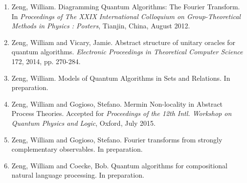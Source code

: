\begin{enumerate}
\item Zeng, William. Diagramming Quantum Algorithms: The Fourier Transform. In \emph{Proceedings of The XXIX International Colloquium on Group-Theoretical Methods in Physics
: Posters}, Tianjin, China, August 2012.
\item Zeng, William and Vicary, Jamie. Abstract structure of unitary oracles for quantum algorithms. \emph{Electronic Proceedings in Theoretical Computer Science} 172, 2014, pp. 270-284.
\item Zeng, William. Models of Quantum Algorithms in Sets and Relations. In preparation.
\item Zeng, William and Gogioso, Stefano. Mermin Non-locality in Abstract Process Theories. Accepted for \emph{Proceedings of the 12th Intl. Workshop on Quantum Physics and Logic}, Oxford, July 2015.
\item Zeng, William and Gogioso, Stefano. Fourier transforms from strongly complementary observables. In preparation.
\item Zeng, William and Coecke, Bob. Quantum algorithms for compositional natural language processing. In preparation.
\end{enumerate}

